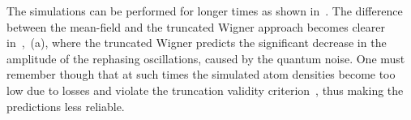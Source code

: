 The simulations can be performed for longer times as shown in~.
The difference between the mean-field and the truncated Wigner approach becomes clearer in~,~(a), where the truncated Wigner predicts the significant decrease in the amplitude of the rephasing oscillations, caused by the quantum noise.
One must remember though that at such times the simulated atom densities become too low due to losses and violate the truncation validity criterion~, thus making the predictions less reliable.
